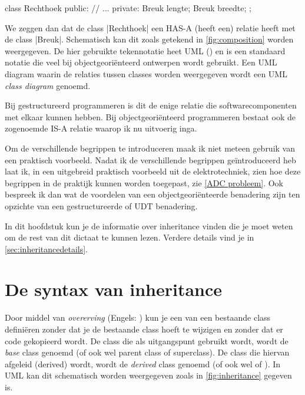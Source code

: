 \begin{cpplstShortInline}
\vspace{-.5\baselineskip}
\begin{minipage}{\textwidth}
\begin{minipage}[c]{.35\textwidth}
\begin{cpplstfragment}
class Rechthoek {
public:
    // ...
private:
    Breuk lengte;
    Breuk breedte;
};
\end{cpplstfragment}
\end{minipage}
\hfill
\begin{minipage}[c]{.65\textwidth}
\end{minipage}
\end{minipage}

We zeggen dan dat de class |Rechthoek| een HAS-A (heeft een) relatie heeft met de class |Breuk|.
Schematisch kan dit zoals getekend in \cref{fig:composition} worden weergegeven. De hier gebruikte tekennotatie heet UML () en is een standaard notatie die veel bij objectgeoriënteerd ontwerpen wordt gebruikt. Een UML diagram waarin de relaties tussen classes worden weergegeven wordt een UML \emph{class diagram} genoemd. 

Bij gestructureerd programmeren is dit de enige relatie die softwarecomponenten met elkaar kunnen hebben.
Bij objectgeoriënteerd programmeren bestaat ook de zogenoemde IS-A relatie waarop ik nu uitvoerig inga.

Om de verschillende begrippen te introduceren maak ik niet meteen gebruik van een praktisch voorbeeld.
Nadat ik de verschillende begrippen geïntroduceerd heb laat ik, in een uitgebreid praktisch voorbeeld uit de elektrotechniek, zien hoe deze begrippen in de praktijk kunnen worden toegepast, zie \cref{ADC probleem}.
Ook bespreek ik dan wat de voordelen van een objectgeoriënteerde benadering zijn ten opzichte van een gestructureerde of UDT benadering.

In dit hoofdstuk kun je de informatie over inheritance vinden die je moet weten om de rest van dit dictaat te kunnen lezen. Verdere details vind je in \cref{sec:inheritancedetails}.


\section{De syntax van inheritance}
Door middel van \emph{overerving} (Engels: \emph{}) kun je een  van een bestaande class definiëren zonder dat je de bestaande class hoeft te wijzigen en zonder dat er code gekopieerd wordt.
De class die als uitgangspunt gebruikt wordt, wordt de \emph{base} class genoemd (of ook wel parent class of superclass).
De class die hiervan afgeleid (derived) wordt, wordt de \emph{derived} class genoemd (of ook wel  of ).
In UML kan dit schematisch worden weergegeven zoals in \cref{fig:inheritance} gegeven is.


\end{cpplstShortInline}
